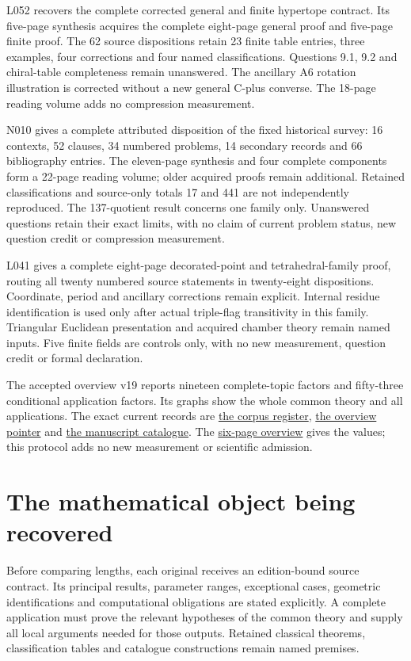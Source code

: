 \documentclass[11pt,a4paper]{article}
\begin{document}
L052 recovers the complete corrected general and finite hypertope contract.
Its five-page synthesis acquires the complete eight-page general proof and
five-page finite proof. The 62 source dispositions retain 23 finite table
entries, three examples, four corrections and four named classifications.
Questions 9.1, 9.2 and chiral-table completeness remain unanswered. The
ancillary A6 rotation illustration is corrected without a new general
C-plus converse. The 18-page reading volume adds no compression measurement.

N010 gives a complete attributed disposition of the fixed historical survey:
16 contexts, 52 clauses, 34 numbered problems, 14 secondary records and
66 bibliography entries. The eleven-page synthesis and four complete
components form a 22-page reading volume; older acquired proofs remain
additional. Retained classifications and source-only totals 17 and 441
are not independently reproduced. The 137-quotient result concerns one
family only. Unanswered questions retain their exact limits, with no claim
of current problem status, new question credit or compression measurement.

L041 gives a complete eight-page decorated-point and tetrahedral-family
proof, routing all twenty numbered source statements in twenty-eight
dispositions. Coordinate, period and ancillary corrections remain explicit.
Internal residue identification is used only after actual triple-flag
transitivity in this family. Triangular Euclidean presentation and acquired
chamber theory remain named inputs. Five finite fields are controls only,
with no new measurement, question credit or formal declaration.

The accepted overview v19 reports nineteen complete-topic factors and fifty-three
conditional application factors. Its graphs show the whole common theory and
all applications. The exact current records are
\href{corpus/latest.json}{the corpus register},
\href{overview/latest.json}{the overview pointer} and
\href{../papers/latest_catalogue.json}{the manuscript catalogue}.
The \href{overview/v19/packet/reader.pdf}{six-page overview} gives the values;
this protocol adds no new measurement or scientific admission.

\section{The mathematical object being recovered}

Before comparing lengths, each original receives an edition-bound source
contract. Its principal results, parameter ranges, exceptional cases, geometric
identifications and computational obligations are stated explicitly. A complete
application must prove the relevant hypotheses of the common theory and supply
all local arguments needed for those outputs. Retained classical theorems,
classification tables and catalogue constructions remain named premises.
\end{document}
